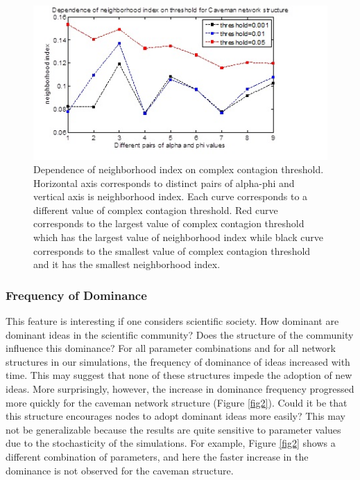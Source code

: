 \begin{figure}
[htp]
\begin{center}
\includegraphics{Fig8}
\end{center}
\caption{Dependence of neighborhood index on complex contagion threshold. Horizontal axis corresponds to distinct pairs of alpha-phi and vertical axis is neighborhood index. Each curve corresponds to a different value of complex contagion threshold. Red curve corresponds to the largest value of complex contagion threshold which has the largest value of neighborhood index while black curve corresponds to the smallest value of complex contagion threshold and it has the smallest neighborhood index.}
\label {fig8}
\end{figure}


\subsubsection{Frequency of Dominance}

This feature is interesting if one considers scientific society. How dominant are dominant ideas in the scientific community? Does the structure of the community influence this dominance? For all parameter combinations and for all network structures in our simulations, the frequency of dominance of ideas increased with time. This may suggest that none of these structures impede the adoption of new ideas. More surprisingly, however, the increase in dominance frequency progressed more quickly for the caveman network structure (Figure \ref{fig2}). Could it be that this structure encourages nodes to adopt dominant ideas more easily? This may not be generalizable because the results are quite sensitive to parameter values due to the stochasticity of the simulations. For example, Figure \ref{fig2} shows a different combination of parameters, and here the faster increase in the dominance is not observed for the caveman structure.

